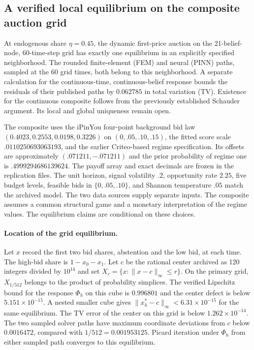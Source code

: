 \providecommand{\CGpage}{}
\subsection{A verified local equilibrium on the composite auction grid}
\label{sec:composite-dynamic-grid}
At endogenous share $\eta=0.45$, the dynamic first-price auction on the
21-belief-node, 60-time-step grid has exactly one equilibrium in an explicitly
specified neighborhood. The rounded finite-element (FEM) and neural (PINN)
paths, sampled at the 60 grid times, both belong to this neighborhood.
A separate calculation for the continuous-time, continuous-belief response
bounds the residuals of their published paths by $0.062785$ in total variation
(TV). Existence for the continuous composite follows from the previously
established Schauder argument. Its local and global uniqueness remain open.

The composite uses the iPinYou four-point background bid law
$(0.4023,0.2553,0.0198,0.3226)$ on $(0,.05,.10,.15)$, the fitted score
scale $.0110250693063193$, and the earlier Criteo-based regime specification.
Its offsets are approximately $(.071211,-.071211)$ and the prior probability
of regime one is $.4999294686139624$. The payoff array and exact decimals
are frozen in the replication files. The unit horizon, signal volatility $.2$,
opportunity rate $2.25$, five budget levels, feasible bids in $\{0,.05,.10\}$,
and Shannon temperature $.05$ match the archived model. The two data sources
supply separate inputs. The composite assumes a common structural game and
a monetary interpretation of the regime values. The equilibrium claims
are conditional on these choices.

\paragraph{Location of the grid equilibrium.}
Let $x$ record the first two bid shares, abstention and the low bid, at each
time. The high-bid share is $1-x_0-x_1$. Let $c$ be the rational center
archived as 120 integers divided by $10^{14}$ and set
$X_r=\{x:\|x-c\|_\infty\leq r\}$. On the primary grid, $X_{1/512}$
belongs to the product of probability simplices. The verified Lipschitz bound
for the response $\Phi_h$ on this cube is $0.996801$ and the center
defect is below $5.151\times10^{-15}$. A nested smaller cube gives
$\|x^*_h-c\|_\infty<6.31\times 10^{-15}$ for the same equilibrium.
The TV error of the center on this grid is below $1.262\times10^{-14}$.
The two sampled solver paths have maximum coordinate deviations from $c$
below $0.0016472$, compared with $1/512=0.001953125$.
Picard iteration under $\Phi_h$ from either sampled path converges to
this equilibrium.

